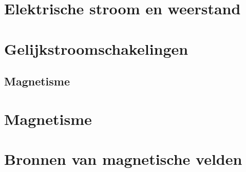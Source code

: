 \documentclass{exam}
\begin{document}
\newpage

\newpage

\section{Elektrische stroom en weerstand}

\vspace{0.5cm}



\newpage

\section{Gelijkstroomschakelingen}

\vspace{0.5cm}



\newpage

\vspace*{\fill}
\begin{center}
    
\section*{Magnetisme}
\end{center}

\vspace*{\fill}

\newpage

\section{Magnetisme}


\newpage

\section{Bronnen van magnetische velden}

\end{document}
